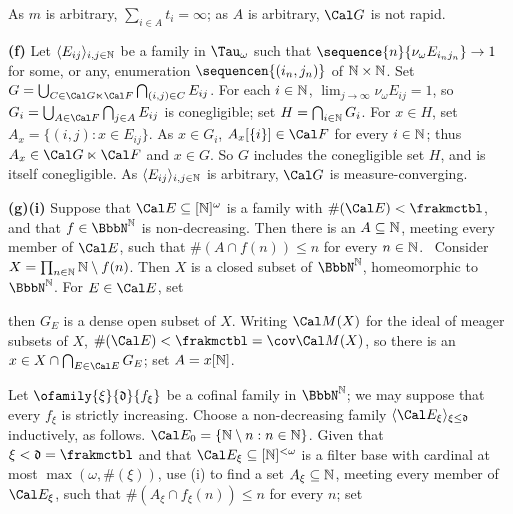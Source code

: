 {\noindent As $m$ is arbitrary, $\sum_{i\in A}t_i=\infty$;  as $A$ is
arbitrary, $\Cal G$ is not rapid.\ \Qed

\medskip

{\bf (f)} Let
$\langle E_{ij}\rangle_{i,j\in\Bbb N}$ be a family in $\Tau_{\omega}$
such that $\sequence{n}{\nu_{\omega}E_{i_nj_n}}\to 1$ for some, or
any, enumeration $\sequencen{(i_n,j_n)}$ of $\Bbb N\times\Bbb N$.
Set $G=\bigcup_{C\in\Cal G\ltimes\Cal F}\bigcap_{(i,j)\in C}E_{ij}$.
For each $i\in\Bbb N$, $\lim_{j\to\infty}\nu_{\omega}E_{ij}=1$, so
$G_i=\bigcup_{A\in\Cal F}\bigcap_{j\in A}E_{ij}$ is conegligible;  set
$H=\bigcap_{i\in\Bbb N}G_i$.   For $x\in H$, set
$A_x=\{(i,j):x\in E_{ij}\}$.   As $x\in G_i$, $A_x[\{i\}]\in\Cal F$ for
every $i\in\Bbb N$;  thus $A_x\in\Cal G\ltimes\Cal F$ and $x\in G$.
So $G$ includes the conegligible set $H$, and is itself conegligible.
As $\langle E_{ij}\rangle_{i,j\in\Bbb N}$ is arbitrary, $\Cal G$ is
measure-converging.

\medskip

{\bf (g)(i)} Suppose that $\Cal E\subseteq[\Bbb N]^{\omega}$ is a
family with $\#(\Cal E)<\frakmctbl$, and that $f\in\NN$
is non-decreasing.   Then there
is an $A\subseteq\Bbb N$, meeting every member of $\Cal E$,
such that $\#(A\cap f(n))\le n$ for every $n\in\Bbb N$.   \Prf\
Consider
$X=\prod_{n\in\Bbb N}\Bbb N\setminus f(n)$.   Then $X$ is a closed subset
of $\NN$, homeomorphic to $\NN$.   For $E\in\Cal E$, set


\noindent then $G_E$ is a dense open subset of $X$.   Writing $\Cal M(X)$
for the ideal of meager subsets of $X$,
$\#(\Cal E)<\frakmctbl=\cov\Cal M(X)$, so there is an
$x\in X\cap\bigcap_{E\in\Cal E}G_E$;  set $A=x[\Bbb N]$.\ \Qed

\medskip

 Let $\ofamily{\xi}{\frak d}{f_{\xi}}$ be a cofinal family
in $\BbbN^{\Bbb N}$;  we may suppose that every $f_{\xi}$ is
strictly increasing.    Choose a non-decreasing family
$\langle\Cal E_{\xi}\rangle_{\xi\le\frak d}$
inductively, as follows.
$\Cal E_0=\{\Bbb N\setminus n:n\in\Bbb N\}$.   Given that
$\xi<\frak d=\frakmctbl$ and that
$\Cal E_{\xi}\subseteq[\Bbb N]^{<\omega}$ is a filter base with cardinal at
most $\max(\omega,\#(\xi))$, use (i) to find a set
$A_{\xi}\subseteq\Bbb N$, meeting every member of $\Cal E_{\xi}$, such that
$\#(A_{\xi}\cap f_{\xi}(n))\le n$ for every $n$;  set


}
